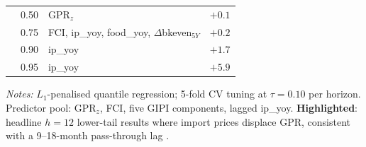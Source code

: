 \documentclass[12pt]{article}
\begin{document}
\begin{table}[htbp]
\begin{center}
\begin{threeparttable}
\begin{tabular}{@{}cc>{\raggedright\arraybackslash}p{6.2cm}r@{}}
 & 0.50 & GPR$_z$                                               & $+0.1$\\
 & 0.75 & FCI, ip\_yoy, food\_yoy, $\Delta$bkeven$_{5Y}$        & $+0.2$\\
 & 0.90 & ip\_yoy                                               & $+1.7$\\
 & 0.95 & ip\_yoy                                               & $+5.9$\\
\bottomrule
\end{tabular}
\begin{tablenotes}[flushleft]\footnotesize
\item \textit{Notes:}
$L_1$-penalised quantile regression; 5-fold CV tuning at $\tau=0.10$ per horizon.
Predictor pool: GPR$_z$, FCI, five GIPI components, lagged ip\_yoy.
\textbf{Highlighted}: headline $h=12$ lower-tail results where import prices displace GPR,
consistent with a 9--18-month pass-through lag \citep{conflitti2019}.
\end{tablenotes}
\end{threeparttable}
\end{center}\end{table}
\end{document}
